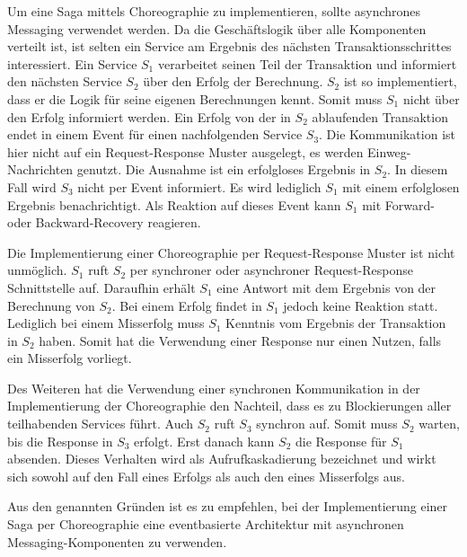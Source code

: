 Um eine Saga mittels Choreographie zu implementieren, sollte asynchrones Messaging verwendet werden. Da die Geschäftslogik über alle Komponenten verteilt ist, ist selten ein Service am Ergebnis des nächsten Transaktionsschrittes interessiert. Ein Service $S_1$ verarbeitet seinen Teil der Transaktion und informiert den nächsten Service $S_2$ über den Erfolg der Berechnung. $S_2$ ist so implementiert, dass er die Logik für seine eigenen Berechnungen kennt. Somit muss $S_1$ nicht über den Erfolg informiert werden. Ein Erfolg von der in $S_2$ ablaufenden Transaktion endet in einem Event für einen nachfolgenden Service $S_3$. Die Kommunikation ist hier nicht auf ein Request-Response Muster ausgelegt, es werden Einweg-Nachrichten genutzt.
Die Ausnahme ist ein erfolgloses Ergebnis in $S_2$. In diesem Fall wird $S_3$ nicht per Event informiert. Es wird lediglich $S_1$ mit einem erfolglosen Ergebnis benachrichtigt. Als Reaktion auf dieses Event kann $S_1$ mit Forward- oder Backward-Recovery reagieren.

Die Implementierung einer Choreographie per Request-Response Muster ist nicht unmöglich. $S_1$ ruft $S_2$ per synchroner oder asynchroner Request-Response Schnittstelle auf. Daraufhin erhält $S_1$ eine Antwort mit dem Ergebnis von der Berechnung von $S_2$. Bei einem Erfolg findet in $S_1$ jedoch keine Reaktion statt. Lediglich bei einem Misserfolg muss $S_1$ Kenntnis vom Ergebnis der Transaktion in $S_2$ haben. Somit hat die Verwendung einer Response nur einen Nutzen, falls ein Misserfolg vorliegt.

Des Weiteren hat die Verwendung einer synchronen Kommunikation in der Implementierung der Choreographie den Nachteil, dass es zu Blockierungen aller teilhabenden Services führt. Auch $S_2$ ruft $S_3$ synchron auf. Somit muss $S_2$ warten, bis die Response in $S_3$ erfolgt. Erst danach kann $S_2$ die Response für $S_1$ absenden. Dieses Verhalten wird als Aufrufkaskadierung bezeichnet und wirkt sich sowohl auf den Fall eines Erfolgs als auch den eines Misserfolgs aus. 

Aus den genannten Gründen ist es zu empfehlen, bei der Implementierung einer Saga per Choreographie eine eventbasierte Architektur mit asynchronen Messaging-Komponenten zu verwenden.
